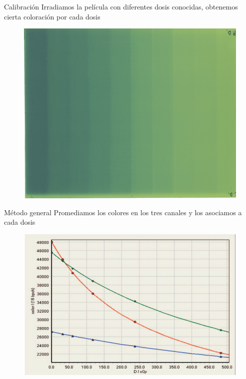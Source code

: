 \documentclass[12pt]{beamer}
\begin{document}
\begin{frame}{Calibración}
	Irradiamos la película con diferentes dosis conocidas, obtenemos cierta coloración por cada dosis
	\begin{figure}
		\centering
		\includegraphics[width=\linewidth]{images/calibracionSimpleLandscape.png}
	\end{figure}
\end{frame}

\begin{frame}{Método general}
	Promediamos los colores en los tres canales y los asociamos a cada dosis
	\begin{figure}
		\centering
		\includegraphics[width=\linewidth]{images/respses.png}
	\end{figure}
\end{frame}
\end{document}
